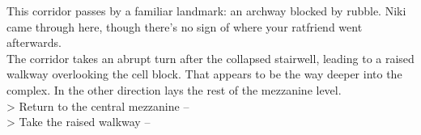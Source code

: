 This corridor passes by a familiar landmark: an archway blocked by rubble. Niki came through here, though there’s no sign of where your ratfriend went afterwards.\\

The corridor takes an abrupt turn after the collapsed stairwell, leading to a raised walkway overlooking the cell block. That appears to be the way deeper into the complex. In the other direction lays the rest of the mezzanine level.\\

> Return to the central mezzanine -- \\
> Take the raised walkway -- 
